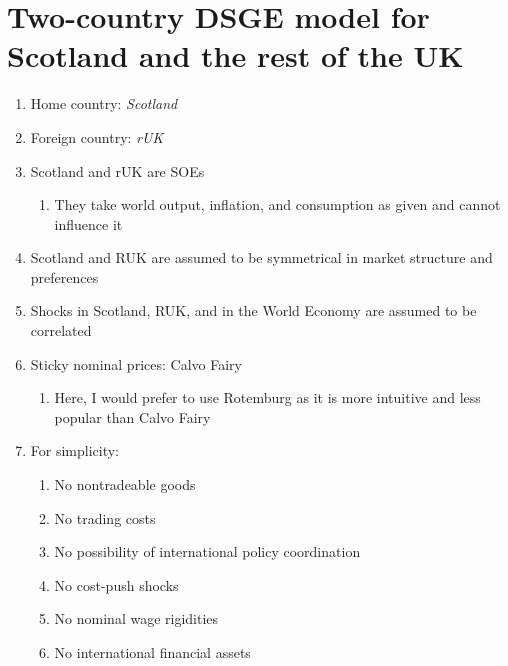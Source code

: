 \section*{Two-country DSGE model for Scotland and the rest of the UK}

\begin{enumerate}
    \item Home country: \textit{Scotland}
    \item  Foreign country: \textit{rUK}
    \item  Scotland and rUK are SOEs
          \begin{enumerate}
              \item They take world output, inflation, and consumption as given and cannot influence it
          \end{enumerate}
    \item Scotland and RUK are assumed to be symmetrical in market structure and preferences
    \item Shocks in Scotland, RUK, and in the World Economy are assumed to be correlated
    \item Sticky nominal prices: Calvo Fairy
          \begin{enumerate}
              \item Here, I would prefer to use Rotemburg as it is more intuitive and less popular than Calvo Fairy
          \end{enumerate}
    \item For simplicity:
          \begin{enumerate}
              \item No nontradeable goods
              \item No trading costs
              \item No possibility of international policy coordination
              \item No cost-push shocks
              \item No nominal wage rigidities
              \item No international financial assets
          \end{enumerate}

\end{enumerate}
